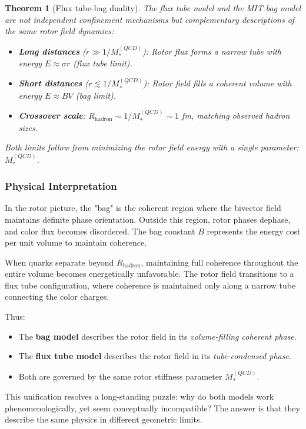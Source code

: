 \documentclass[11pt,a4paper]{article}
\theoremstyle{definition}
\theoremstyle{plain}
\newtheorem{theorem}{Theorem}[section]
\theoremstyle{remark}
\begin{document}
\begin{theorem}[Flux tube-bag duality]
The flux tube model and the MIT bag model are not independent confinement mechanisms but complementary descriptions of the same rotor field dynamics:
\begin{itemize}[leftmargin=*,itemsep=3pt]
  \item \textbf{Long distances} ($r \gg 1/M_*^{(QCD)}$): Rotor flux forms a narrow tube with energy $E \approx \sigma r$ (flux tube limit).
  \item \textbf{Short distances} ($r \lesssim 1/M_*^{(QCD)}$): Rotor field fills a coherent volume with energy $E \approx B V$ (bag limit).
  \item \textbf{Crossover scale}: $R_{\mathrm{hadron}} \sim 1/M_*^{(QCD)} \sim 1$ fm, matching observed hadron sizes.
\end{itemize}
Both limits follow from minimizing the rotor field energy with a single parameter: $M_*^{(QCD)}$.
\end{theorem}

\subsubsection{Physical Interpretation}

In the rotor picture, the "bag" is the coherent region where the bivector field maintains definite phase orientation. Outside this region, rotor phases dephase, and color flux becomes disordered. The bag constant $B$ represents the energy cost per unit volume to maintain coherence.

When quarks separate beyond $R_{\mathrm{hadron}}$, maintaining full coherence throughout the entire volume becomes energetically unfavorable. The rotor field transitions to a flux tube configuration, where coherence is maintained only along a narrow tube connecting the color charges.

Thus:
\begin{itemize}[leftmargin=*,itemsep=3pt]
  \item The \textbf{bag model} describes the rotor field in its \emph{volume-filling coherent phase}.
  \item The \textbf{flux tube model} describes the rotor field in its \emph{tube-condensed phase}.
  \item Both are governed by the same rotor stiffness parameter $M_*^{(QCD)}$.
\end{itemize}

This unification resolves a long-standing puzzle: why do both models work phenomenologically, yet seem conceptually incompatible? The answer is that they describe the same physics in different geometric limits.
\end{document}
